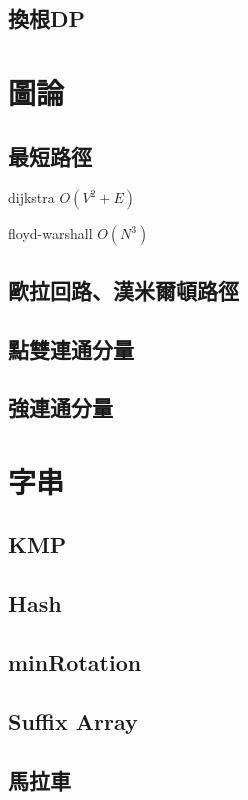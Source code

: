 \documentclass[a4paper,10pt,twocolumn,oneside]{article}
\begin{document}
\subsection{換根DP}



\section{圖論}
\subsection{最短路徑}
dijkstra $O({V}^2 + E)$

floyd-warshall $O({N}^3)$

\subsection{歐拉回路、漢米爾頓路徑}


\subsection{點雙連通分量}

\subsection{強連通分量}



\section{字串}
\subsection{KMP}

\subsection{Hash}

\subsection{minRotation}

\subsection{Suffix Array}

\subsection{馬拉車}

\end{document}
